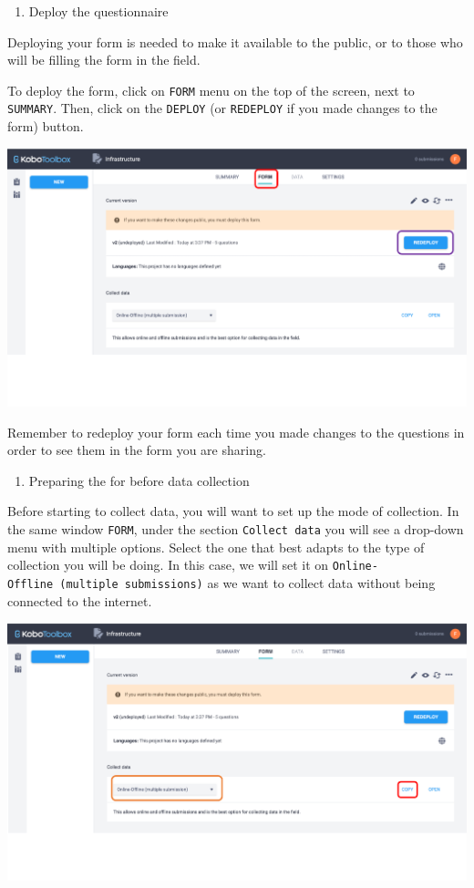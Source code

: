 \documentclass[
  letterpaper,
  DIV=11,
  numbers=noendperiod]{scrartcl}
\providecommand{\tightlist}{%
  \setlength{\itemsep}{0pt}\setlength{\parskip}{0pt}}\usepackage{longtable,booktabs,array}
\begin{document}
\begin{enumerate}
\def\labelenumi{\arabic{enumi}.}
\setcounter{enumi}{1}
\tightlist
\item
  Deploy the questionnaire
\end{enumerate}

Deploying your form is needed to make it available to the public, or to
those who will be filling the form in the field.

To deploy the form, click on \texttt{FORM} menu on the top of the
screen, next to \texttt{SUMMARY}. Then, click on the \texttt{DEPLOY} (or
\texttt{REDEPLOY} if you made changes to the form) button.

\includegraphics{kobotoolbox_tutorial_files/img/img13.png}

Remember to redeploy your form each time you made changes to the
questions in order to see them in the form you are sharing.

\begin{enumerate}
\def\labelenumi{\arabic{enumi}.}
\setcounter{enumi}{2}
\tightlist
\item
  Preparing the for before data collection
\end{enumerate}

Before starting to collect data, you will want to set up the mode of
collection. In the same window \texttt{FORM}, under the section
\texttt{Collect\ data} you will see a drop-down menu with multiple
options. Select the one that best adapts to the type of collection you
will be doing. In this case, we will set it on
\texttt{Online-Offline\ (multiple\ submissions)} as we want to collect
data without being connected to the internet.

\includegraphics{kobotoolbox_tutorial_files/img/img14.png}
\end{document}

